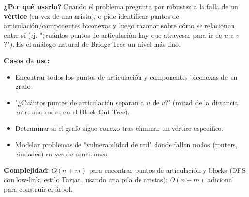 \documentclass[10pt,a4paper,twocolumn]{article}
\begin{document}
\textbf{¿Por qué usarlo?} Cuando el problema pregunta por robustez a
la falla de un \textbf{vértice} (en vez de una arista), o pide
identificar puntos de articulación/componentes biconexas y luego
razonar sobre cómo se relacionan entre sí (ej. "¿cuántos puntos de
articulación hay que atravesar para ir de $u$ a $v$?"). Es el
análogo natural de Bridge Tree un nivel más fino.

\textbf{Casos de uso:}

\begin{itemize}
    \item Encontrar todos los puntos de articulación y componentes
    biconexas de un grafo.
    \item "¿Cuántos puntos de articulación separan a $u$ de $v$?"
    (mitad de la distancia entre sus nodos en el Block-Cut Tree).
    \item Determinar si el grafo sigue conexo tras eliminar un
    vértice específico.
    \item Modelar problemas de "vulnerabilidad de red" donde fallan
    nodos (routers, ciudades) en vez de conexiones.
\end{itemize}

\textbf{Complejidad:} $O(n + m)$ para encontrar puntos de
articulación y blocks (DFS con low-link, estilo Tarjan, usando una
pila de aristas); $O(n + m)$ adicional para construir el árbol.
\end{document}
